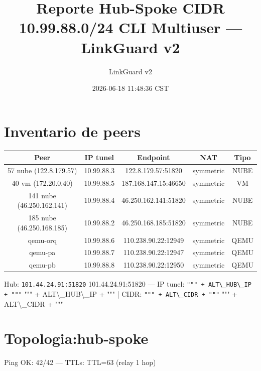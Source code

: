 \documentclass[11pt,a4paper]{article}
\title{Reporte Hub-Spoke CIDR 10.99.88.0/24 CLI Multiuser — LinkGuard v2}
\author{LinkGuard v2}
\date{2026-06-18 11:48:36 CST}
\begin{document}
\maketitle

\section{Inventario de peers}
\begin{longtable}{|c|c|c|c|c|}
\hline
Peer & IP tunel & Endpoint & NAT & Tipo \\ \hline
57 nube (122.8.179.57) & 10.99.88.3 & 122.8.179.57:51820 & symmetric & NUBE \\ \hline
40 vm (172.20.0.40) & 10.99.88.5 & 187.168.147.15:46650 & symmetric & VM \\ \hline
141 nube (46.250.162.141) & 10.99.88.4 & 46.250.162.141:51820 & symmetric & NUBE \\ \hline
185 nube (46.250.168.185) & 10.99.88.2 & 46.250.168.185:51820 & symmetric & NUBE \\ \hline
qemu-orq & 10.99.88.6 & 110.238.90.22:12949 & symmetric & QEMU \\ \hline
qemu-pa & 10.99.88.7 & 110.238.90.22:12947 & symmetric & QEMU \\ \hline
qemu-pb & 10.99.88.8 & 110.238.90.22:12950 & symmetric & QEMU \\ \hline
\end{longtable}

Hub:  \texttt{101.44.24.91:51820} 101.44.24.91:51820  — IP tunel:  \texttt{""" + ALT\textbackslash{}_HUB\textbackslash{}_IP + """} """ + ALT\textbackslash{}_HUB\textbackslash{}_IP + """  | CIDR:  \texttt{""" + ALT\textbackslash{}_CIDR + """} """ + ALT\textbackslash{}_CIDR + """\\

\section{Topologia:hub-spoke}
Ping OK: 42/42 — TTLs: TTL=63 (relay 1 hop)\\
\end{document}
